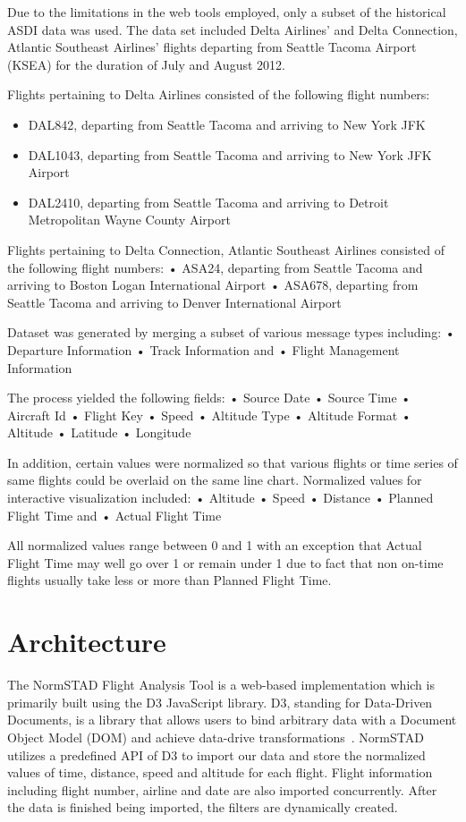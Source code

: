 \documentclass{sig-alternate}
\begin{document}
Due to the limitations in the web tools employed, only a
subset of the historical ASDI data was used. The data
set included Delta Airlines' and Delta Connection, Atlantic
Southeast Airlines’ flights departing from Seattle
Tacoma Airport (KSEA) for the duration of July
and August 2012.

Flights pertaining to Delta Airlines consisted
of the following flight numbers:
\begin{itemize}{labelitemi}{$\bullet$}
\item DAL842, departing from Seattle Tacoma
and arriving to New York JFK
\item  DAL1043, departing from Seattle Tacoma
and arriving to New York JFK Airport
\item  DAL2410, departing from Seattle Tacoma
and arriving to Detroit Metropolitan
Wayne  County Airport
\end{itemize}

Flights pertaining to Delta Connection,
Atlantic Southeast Airlines consisted of the
following flight numbers:
• ASA24, departing from Seattle Tacoma
and arriving to Boston Logan International
Airport
• ASA678, departing from Seattle Tacoma
and arriving to Denver International
Airport

Dataset was generated by merging a subset of
various message types including:
• Departure Information
• Track Information and
• Flight Management Information

The process yielded the following fields:
• Source Date
• Source Time
• Aircraft Id
• Flight Key
• Speed
• Altitude Type
• Altitude Format
• Altitude
• Latitude
• Longitude

In addition, certain values were normalized
so that various flights or time series of same
flights could be overlaid on the same line chart.
Normalized values for interactive visualization
included:
• Altitude
• Speed
• Distance
• Planned Flight Time and
• Actual Flight Time

All normalized values range between 0 and 1
with an exception that Actual Flight Time may
well go over 1 or remain under 1 due to fact
that non on-time flights usually take less or
more than Planned Flight Time.

\section{Architecture}
\label{sec-architecture}

The NormSTAD Flight Analysis Tool is a web-based implementation which is primarily built
using the D3 JavaScript library. D3, standing for Data-Driven Documents, is a 
library that allows users to bind arbitrary data with a Document Object Model (DOM)
and achieve data-drive transformations~\cite{D3}. NormSTAD utilizes a predefined API of D3
to import our data and store the normalized values of time, distance, speed and altitude
for each flight. Flight information including flight number, airline and date are also imported
concurrently. After the data is finished being imported, the filters are dynamically created.
\end{document}
